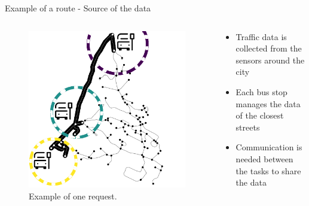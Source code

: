 \documentclass[Ligatures=TeX,table,svgnames,usetotalslideindicator,compress,10pt,aspectratio=169]{beamer}
\begin{document}
\begin{frame}{Example of a route -  Source of the data} 
\begin{columns}        

\begin{column}{0.5\textwidth}
   \begin{figure}[!h]
        \centering
        \includegraphics[width=\textwidth]{images/bus_stops_data.png}
        \caption{Example of one request.}
      \end{figure}

\end{column}
\begin{column}{0.5\textwidth}
   \begin{itemize}
       \item Traffic data is collected from the sensors around the city
       \item Each bus stop manages the data of the closest streets
       \item Communication is needed between the tasks to share the data
   \end{itemize}
\end{column}

\end{columns}
\end{frame}
\addtocounter{framenumber}{-1}
\end{document}
